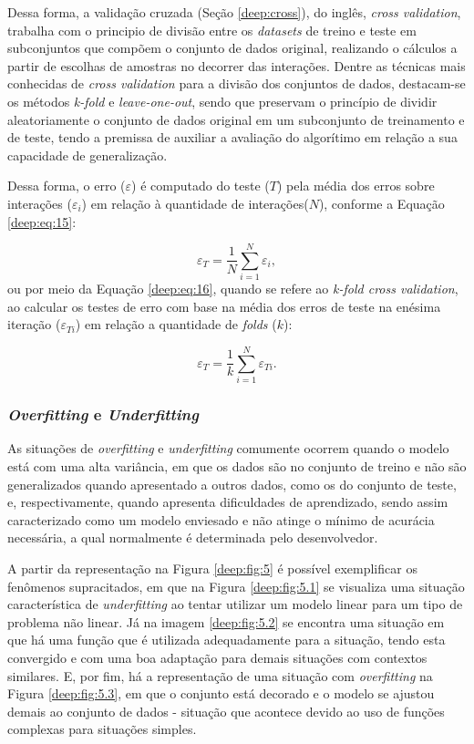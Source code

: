 Dessa forma, a validação cruzada (Seção \ref{deep:cross}), do inglês, \textit{cross validation}, trabalha com o principio de divisão entre os \textit{datasets} de treino e teste em subconjuntos que compõem o conjunto de dados original, realizando o cálculos a partir de escolhas de amostras no decorrer das interações. Dentre as técnicas mais conhecidas de \textit{cross validation} para a divisão dos conjuntos de dados, destacam-se os métodos \textit{k-fold} e \textit{leave-one-out}, sendo que preservam o princípio de dividir aleatoriamente o conjunto de dados original em um subconjunto de treinamento e de teste, tendo a premissa de auxiliar a avaliação do algorítimo em relação a sua capacidade de generalização.

Dessa forma, o erro ($\varepsilon$) é computado do teste ($T$) pela média dos erros sobre interações ($\varepsilon_i$) em relação à quantidade de interações($N$), conforme a Equação \ref{deep:eq:15}:

\begin{equation}
    \label{deep:eq:15}
    \varepsilon_T = \frac{1}{N} \sum_{i=1}^{N} \varepsilon_i,
\end{equation}
ou por meio da Equação \ref{deep:eq:16}, quando se refere ao \textit{k-fold cross validation}, ao calcular os testes de erro com base na média dos erros de teste na enésima iteração ($\varepsilon_{Ti}$) em relação a quantidade de \textit{folds} ($k$):

\begin{equation}
    \label{deep:eq:16}
    \varepsilon_T = \frac{1}{k} \sum_{i=1}^{N} \varepsilon_{Ti}.
\end{equation}

\subsubsection{\textit{Overfitting} e \textit{Underfitting}}
\label{deep:overunder}

As situações de \textit{overfitting} e \textit{underfitting} comumente ocorrem quando o modelo está com uma alta variância, em que os dados são  no conjunto de treino e não são generalizados quando apresentado a outros dados, como os do conjunto de teste, e, respectivamente, quando apresenta dificuldades de aprendizado, sendo assim caracterizado como um modelo enviesado e não atinge o mínimo de acurácia necessária, a qual normalmente é determinada pelo desenvolvedor.

A partir da representação na Figura \ref{deep:fig:5} é possível exemplificar os fenômenos supracitados, em que na Figura \ref{deep:fig:5.1} se visualiza uma situação característica de \textit{underfitting} ao tentar utilizar um modelo linear para um tipo de problema não linear. Já na imagem \ref{deep:fig:5.2} se encontra uma situação em que há uma função que é utilizada adequadamente para a situação, tendo esta convergido e com uma boa adaptação para demais situações com contextos similares. E, por fim, há a representação de uma situação com \textit{overfitting} na Figura \ref{deep:fig:5.3}, em que o conjunto está decorado e o modelo se ajustou demais ao conjunto de dados - situação que acontece devido ao uso de funções complexas para situações simples.

